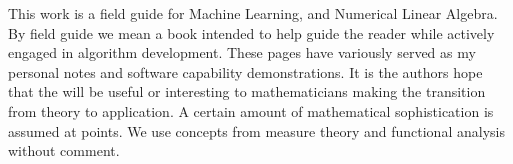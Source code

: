 This work is a field guide for Machine Learning, and Numerical Linear Algebra. By field guide we mean a book intended to help guide the reader while actively engaged in algorithm development.  These pages have variously served as my personal notes and software capability demonstrations. It is the authors hope that the will be useful or interesting to mathematicians making the transition from theory to application.  A certain amount of mathematical sophistication is assumed at points.  We use concepts from measure theory and functional analysis without comment.



\smallskip






